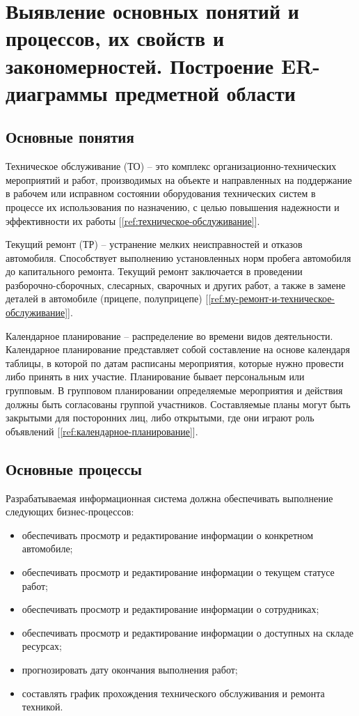 \documentclass[../nirs.tex]{subfiles}
\begin{document}
\section{Выявление основных понятий и процессов, их свойств и закономерностей.
Построение ER-диаграммы предметной области}

\subsection{Основные понятия}
Техническое обслуживание (ТО) -- это комплекс организационно-технических мероприятий
и работ, производимых на объекте и направленных на поддержание в рабочем или
исправном состоянии оборудования технических систем в процессе их использования
по назначению, с целью повышения надежности и эффективности их работы
[\ref{ref:техническое-обслуживание}].

Текущий ремонт (ТР) -- устранение мелких неисправностей и отказов автомобиля.
Способствует выполнению установленных норм пробега автомобиля до капитального
ремонта. Текущий ремонт заключается в проведении разборочно-сборочных,
слесарных, сварочных и других работ, а также в замене деталей в автомобиле
(прицепе, полуприцепе) [\ref{ref:му-ремонт-и-техническое-обслуживание}].

Календарное планирование -- распределение во времени видов деятельности.
Календарное планирование представляет собой составление на основе календаря
таблицы, в которой по датам расписаны мероприятия, которые нужно провести либо
принять в них участие.
Планирование бывает персональным или групповым.
В групповом планировании определяемые мероприятия и действия должны быть
согласованы группой участников.
Составляемые планы могут быть закрытыми для посторонних лиц, либо открытыми, где
они играют роль объявлений [\ref{ref:календарное-планирование}].

\subsection{Основные процессы}
Разрабатываемая информационная система должна обеспечивать выполнение следующих
бизнес-процессов:
\begin{itemize}
  \item обеспечивать просмотр и редактирование информации о конкретном
    автомобиле;
  \item обеспечивать просмотр и редактирование информации о текущем статусе
    работ;
  \item обеспечивать просмотр и редактирование информации о сотрудниках;
  \item обеспечивать просмотр и редактирование информации о доступных на
    складе ресурсах;
  \item прогнозировать дату окончания выполнения работ;
  \item составлять график прохождения технического обслуживания и ремонта
    техникой.
\end{itemize}
\end{document}
